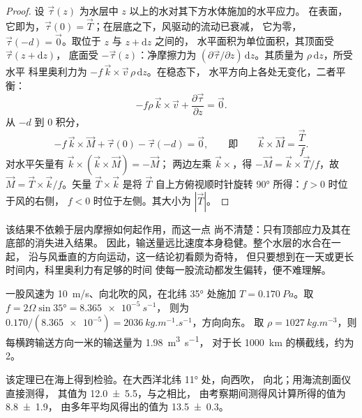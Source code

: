 \begin{proof}
设 $\vec\tau(z)$ 为水层中 $z$ 以上的水对其下方水体施加的水平应力。
在表面，它即为，$\vec\tau(0) =
\vec T$；在层底之下，风驱动的流动已衰减，
它为零，$\vec\tau(-d) = \vec 0$。取位于 $z$ 与 $z + \mathrm dz$ 之间的，
水平面积为单位面积，其顶面受 $\vec\tau(z + \mathrm dz)$，
底面受 $-\vec\tau(z)$：净摩擦力为 $(\partial\vec
\tau/\partial z)\,\mathrm dz$。其质量为 $\rho\,\mathrm dz$，所受水平
科里奥利力为 $-f\,\vec k\times\vec v\,\rho\,\mathrm dz$。在稳态下，
水平方向上各处无变化，二者平衡：
\[
  -f\rho\,\vec k\times\vec v + \frac{\partial\vec\tau}{\partial z} = \vec 0 .
\]
从 $-d$ 到 $0$ 积分，
\[
  -f\,\vec k\times\vec M + \vec\tau(0) - \vec\tau(-d) = \vec 0,
  \qquad\text{即}\qquad \vec k\times\vec M = \frac{\vec T}{f}.
\]
对水平矢量有 $\vec k\times(\vec k\times\vec M) = -\vec M$；
两边左乘 $\vec k\times$，得 $-\vec M = \vec k\times\vec T/f$，故 $\vec M =
\vec T\times\vec k/f$。矢量 $\vec T\times\vec k$ 是将 $\vec T$
自上方俯视顺时针旋转 \ang{90} 所得：$f > 0$ 时位于风的右侧，
$f < 0$ 时位于左侧。其大小为 $|\vec T|$。
\end{proof}

该结果不依赖于层内摩擦如何起作用，而这一点
尚不清楚：只有顶部应力及其在底部的消失进入结果。
因此，输送量远比速度本身稳健。整个水层的水合在一起，
沿与风垂直的方向运动，这一结论初看颇为奇特，
但只要想到在一天或更长时间内，科里奥利力有足够的时间
使每一股流动都发生偏转，便不难理解。

\begin{example}[清劲风下的输送]\label{ex:b1:ocean-circulation:transport}
一股风速为 \qty{10}{m/s}、向北吹的风，在北纬 \ang{35} 处施加
$T = \qty{0.170}{Pa}$。取 $f = 2\Omega\sin\ang{35} = \qty{8.365e-5}{s^{-1}}$，
则为 $0.170/(\num{8.365e-5}) = \qty{2036}{kg.m^{-1}.s^{-1}}$，方向向东。
取 $\rho = \qty{1027}{kg.m^{-3}}$，则每横跨输送方向一米的输送量为 \qty{1.98}{m^3.s^{-1}}，
对于长 \qty{1000}{km} 的横截线，约为
\qty{2}{\sverdrup}。
\end{example}

该定理已在海上得到检验。在大西洋北纬 \ang{11} 处，向西吹，
向北；用海流剖面仪直接测得，
其值为
\qty[uncertainty-mode=separate]{12.0 \pm 5.5}{\sverdrup}，与之相比，
由考察期间测得风计算所得的值为
\qty[uncertainty-mode=separate]{8.8 \pm 1.9}{\sverdrup}，
由多年平均风得出的值为
\qty[uncertainty-mode=separate]{13.5 \pm 0.3}{\sverdrup}。

